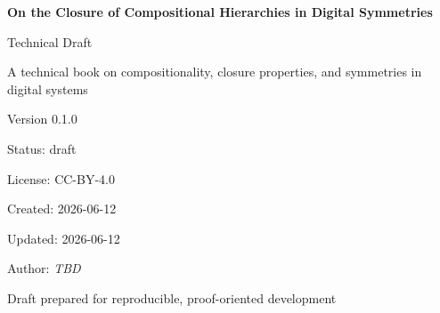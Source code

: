 \documentclass[11pt]{article}
\begin{document}
\begin{titlepage}
\centering
\vspace*{1.25in}

{\Huge\bfseries On the Closure of Compositional Hierarchies in Digital Symmetries\par}
\vspace{0.35in}
{\Large Technical Draft\par}
\vspace{0.8in}

{\large A technical book on compositionality, closure properties, and symmetries in digital systems\par}
\vspace{0.85in}

{\large Version 0.1.0\par}
\vspace{0.25in}
{\large Status: draft\par}
\vspace{0.25in}
{\large License: CC-BY-4.0\par}
\vspace{0.25in}
{\large Created: 2026-06-12\par}
\vspace{0.25in}
{\large Updated: 2026-06-12\par}
\vspace{0.25in}
{\large Author: \textit{TBD}\par}

\vfill

{\large Draft prepared for reproducible, proof-oriented development\par}
\end{titlepage}

\cleardoublepage
\end{document}
